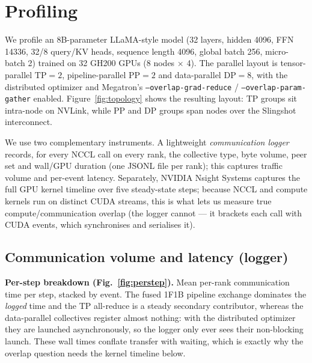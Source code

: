 \section{Profiling}
\label{sec:profiling}

We profile an 8B-parameter LLaMA-style model (32 layers, hidden 4096,
FFN 14336, 32/8 query/KV heads, sequence length 4096, global batch 256,
micro-batch 2) trained on 32 GH200 GPUs (8 nodes $\times$ 4). The
parallel layout is tensor-parallel $\mathrm{TP}=2$, pipeline-parallel
$\mathrm{PP}=2$ and data-parallel $\mathrm{DP}=8$, with the distributed
optimizer and Megatron's \texttt{--overlap-grad-reduce} /
\texttt{--overlap-param-gather} enabled. Figure~\ref{fig:topology} shows
the resulting layout: TP groups sit intra-node on NVLink, while PP and DP
groups span nodes over the Slingshot interconnect.

We use two complementary instruments. A lightweight \emph{communication
logger} records, for every NCCL call on every rank, the collective type,
byte volume, peer set and wall/GPU duration (one JSONL file per rank);
this captures traffic volume and per-event latency. Separately, NVIDIA
Nsight Systems captures the full GPU kernel timeline over five
steady-state steps; because NCCL and compute kernels run on distinct CUDA
streams, this is what lets us measure true compute/communication overlap
(the logger cannot --- it brackets each call with CUDA events, which
synchronises and serialises it).

\subsection{Communication volume and latency (logger)}

\noindent\textbf{Per-step breakdown (Fig.~\ref{fig:perstep}).}
Mean per-rank communication time per step, stacked by event. The fused
1F1B pipeline exchange dominates the \emph{logged} time and the TP
all-reduce is a steady secondary contributor, whereas the data-parallel
collectives register almost nothing: with the distributed optimizer they
are launched asynchronously, so the logger only ever sees their
non-blocking launch. These wall times conflate transfer with waiting,
which is exactly why the overlap question needs the kernel timeline
below.

